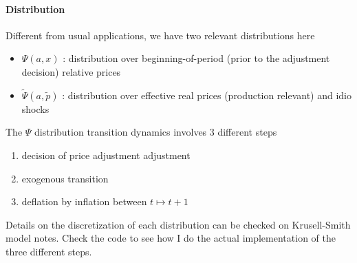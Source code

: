 \documentclass[a4paper,10pt]{article}  %
\begin{document}
\paragraph{Distribution} %
\label{par:distribution}

Different from usual applications, we have two relevant distributions here \\[-1.5\baselineskip]
\begin{itemize}[label=\raisebox{0.25ex}{\tiny $\bullet$ }]
   \item $ \Psi(a,x) $ : distribution over beginning-of-period (prior to the adjustment decision) relative prices 
   \item $ \widetilde{\Psi}(a, \tilde{p}) $ : distribution over effective real prices (production relevant) and idio shocks
\end{itemize}
The $\Psi$ distribution transition dynamics involves 3 different steps
\begin{enumerate}
   \item decision of price adjustment adjustment 
   \item exogenous transition
   \item deflation by inflation between $ t\mapsto t+1 $
\end{enumerate}
Details on the discretization of each distribution can be checked on Krusell-Smith model notes. Check the code to see
how I do the actual implementation of the three different steps. 
\end{document}
